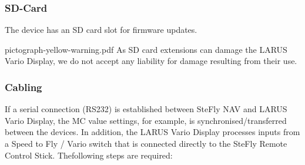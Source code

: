 \subsubsection{SD-Card}
The device has an SD card slot for firmware updates.

\picnote
	{pictograph-yellow-warning.pdf}
	{As SD card extensions can damage the LARUS Vario Display, we do not accept any
	liability for damage resulting from their use.}

\subsubsection{Cabling}

If a serial connection (RS232) is established between SteFly NAV and LARUS Vario Display, the MC
value settings, for example, is synchronised/transferred between the devices. In addition, the LARUS
Vario Display processes inputs from a Speed to Fly / Vario switch that is connected directly to the
SteFly Remote Control Stick.
Thefollowing steps are required:
